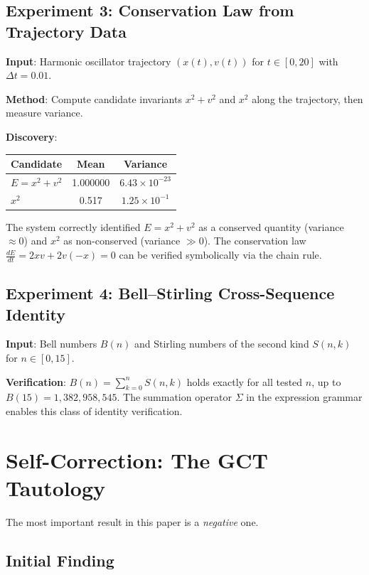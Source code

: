 \documentclass[11pt,a4paper]{article}
\begin{document}
\subsection{Experiment 3: Conservation Law from Trajectory Data}

\textbf{Input}: Harmonic oscillator trajectory $(x(t), v(t))$ for
$t \in [0, 20]$ with $\Delta t = 0.01$.

\textbf{Method}: Compute candidate invariants $x^2 + v^2$ and $x^2$ along
the trajectory, then measure variance.

\textbf{Discovery}:
\begin{center}
\begin{tabular}{lcc}
  \toprule
  Candidate & Mean & Variance \\
  \midrule
  $E = x^2 + v^2$ & 1.000000 & $6.43 \times 10^{-23}$ \\
  $x^2$ & 0.517 & $1.25 \times 10^{-1}$ \\
  \bottomrule
\end{tabular}
\end{center}

The system correctly identified $E = x^2 + v^2$ as a conserved quantity
(variance $\approx 0$) and $x^2$ as non-conserved (variance $\gg 0$). The
conservation law $\frac{dE}{dt} = 2xv + 2v(-x) = 0$ can be verified
symbolically via the chain rule.

\subsection{Experiment 4: Bell--Stirling Cross-Sequence Identity}

\textbf{Input}: Bell numbers $B(n)$ and Stirling numbers of the second kind
$S(n,k)$ for $n \in [0, 15]$.

\textbf{Verification}: $B(n) = \sum_{k=0}^{n} S(n,k)$ holds exactly for
all tested $n$, up to $B(15) = 1{,}382{,}958{,}545$. The summation operator
$\Sigma$ in the expression grammar enables this class of identity
verification.


\section{Self-Correction: The GCT Tautology}
\label{sec:gct}

The most important result in this paper is a \emph{negative} one.

\subsection{Initial Finding}
\end{document}
